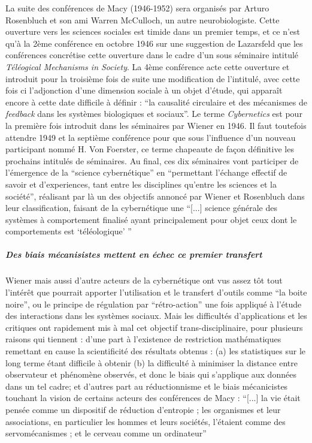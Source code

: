 La suite des conférences de Macy (1946-1952) sera organisés par Arturo Rosenbluch et son ami Warren McCulloch, un autre neurobiologiste. Cette ouverture vers les sciences sociales est timide dans un premier temps, et ce n'est qu'à la 2ème conférence en octobre 1946 sur une suggestion de Lazarsfeld que les conférences concrétise cette ouverture dans le cadre d'un sous séminaire intitulé \textit{Téléogical Mechanisms in Society}. La 4ème conférence acte cette ouverture et introduit pour la troisième fois de suite une modification de l'intitulé, avec cette fois ci l'adjonction d'une dimension sociale à un objet d'étude, qui apparaît encore à cette date difficile à définir : \enquote{la causalité circulaire et des mécanismes de \textit{feedback} dans les systèmes biologiques et sociaux}. Le terme \textit{Cybernetics} est pour la première fois introduit dans les séminaires par Wiener en 1946. Il faut toutefois attendre 1949 et la septième conférence pour que sous l'influence d'un nouveau participant nommé H. Von Foerster, ce terme chapeaute de façon définitive les prochains intitulés de séminaires. Au final, ces dix séminaires vont participer de l'émergence de la \enquote{science cybernétique} en \enquote{permettant l'échange effectif de savoir et d'experiences, tant entre les disciplines qu'entre les sciences et la société}, réalisant par là un des objectifs annoncé par Wiener et Rosenbluch dans leur classification, faisant de la cybernétique une \enquote{[...] science générale des systèmes à comportement finalisé ayant principalement pour objet ceux dont le comportements est \enquote{téléologique} } \autocite{Pouvreau2013}

\subparagraph{Des biais mécanisistes mettent en échec ce premier transfert}

Wiener mais aussi d'autre acteurs de la cybernétique ont vus assez tôt tout l'intérêt que pourrait apporter l'utilisation et le transfert d'outils comme \enquote{la boite noire}, ou le principe de régulation par \enquote{rétro-action} une fois appliqué à l'étude des interactions dans les systèmes sociaux. Mais les difficultés d'applications et les critiques ont rapidement mis à mal cet objectif trans-disciplinaire, pour plusieurs raisons qui tiennent : d'une part à l'existence de restriction mathématiques remettant en cause la scientificité des résultats obtenus : (a) les statistiques sur le long terme étant difficile à obtenir (b) la difficulté à minimiser la distance entre observateur et phénomène observés, et donc le biais qui s'applique aux données dans un tel cadre; et d'autres part au réductionnisme et le biais mécanicistes touchant la vision de certains acteurs des conférences de Macy  : \enquote{[...] la vie était pensée comme un dispositif de réduction d'entropie ; les organismes et leur associations, en particulier les hommes et leurs sociétés, l'étaient comme des servomécanismes ; et le cerveau comme un ordinateur} \autocite[784]{Pouvreau2013}

